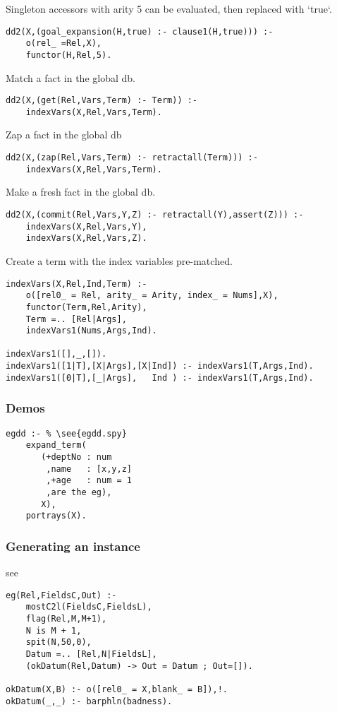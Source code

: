 \documentclass[twocolumn,10pt]{book}
\begin{document}
 Singleton accessors with arity 5 can be evaluated,
    then replaced with `true`.  \begin{Verbatim}
dd2(X,(goal_expansion(H,true) :- clause1(H,true))) :-
    o(rel_ =Rel,X),
    functor(H,Rel,5).
\end{Verbatim}
 Match a fact in the global db.  \begin{Verbatim}
dd2(X,(get(Rel,Vars,Term) :- Term)) :-
    indexVars(X,Rel,Vars,Term).
\end{Verbatim}
 Zap a fact in the global db \begin{Verbatim}
dd2(X,(zap(Rel,Vars,Term) :- retractall(Term))) :-
    indexVars(X,Rel,Vars,Term).
\end{Verbatim}
 Make a fresh fact in the global db.  \begin{Verbatim}
dd2(X,(commit(Rel,Vars,Y,Z) :- retractall(Y),assert(Z))) :-
    indexVars(X,Rel,Vars,Y),
    indexVars(X,Rel,Vars,Z).
\end{Verbatim}
 Create a term with the index variables pre-matched.  \begin{Verbatim}
indexVars(X,Rel,Ind,Term) :-
    o([rel0_ = Rel, arity_ = Arity, index_ = Nums],X),
    functor(Term,Rel,Arity),
    Term =.. [Rel|Args],
    indexVars1(Nums,Args,Ind).

indexVars1([],_,[]).
indexVars1([1|T],[X|Args],[X|Ind]) :- indexVars1(T,Args,Ind).
indexVars1([0|T],[_|Args],   Ind ) :- indexVars1(T,Args,Ind).
\end{Verbatim}
\subsubsection{ Demos }\begin{Verbatim}
egdd :- % \see{egdd.spy}
    expand_term(
       (+deptNo : num
        ,name   : [x,y,z]
        ,+age   : num = 1
        ,are the eg),
       X),
    portrays(X).
\end{Verbatim}

\subsubsection{ Generating an instance
}
 see   \begin{Verbatim}
eg(Rel,FieldsC,Out) :-
    mostC2l(FieldsC,FieldsL),
    flag(Rel,M,M+1),
    N is M + 1,
    spit(N,50,0),
    Datum =.. [Rel,N|FieldsL],
    (okDatum(Rel,Datum) -> Out = Datum ; Out=[]).

okDatum(X,B) :- o([rel0_ = X,blank_ = B]),!.
okDatum(_,_) :- barphln(badness).
\end{Verbatim}
\end{document}
